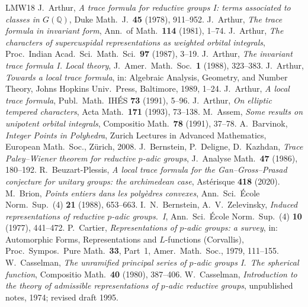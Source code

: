\documentclass[12pt,letterpaper]{article}
\numberwithin{equation}{section}
\theoremstyle{plain}
\theoremstyle{remark}
\theoremstyle{plain}
\theoremstyle{definition}
\theoremstyle{remark}
\theoremstyle{remark}
\begin{document}
\begin{thebibliography}{LMW18}
 J.~Arthur, \emph{A trace formula for reductive groups I: terms associated to classes in $G(\mathbb{Q})$}, Duke Math.\ J.\ \textbf{45} (1978), 911--952.
 J.~Arthur, \emph{The trace formula in invariant form}, Ann.\ of Math.\ \textbf{114} (1981), 1--74.
 J.~Arthur, \emph{The characters of supercuspidal representations as weighted orbital integrals}, Proc.\ Indian Acad.\ Sci.\ Math.\ Sci.\ \textbf{97} (1987), 3--19.
 J.~Arthur, \emph{The invariant trace formula I. Local theory}, J.\ Amer.\ Math.\ Soc.\ \textbf{1} (1988), 323--383.
 J.~Arthur, \emph{Towards a local trace formula}, in: Algebraic Analysis, Geometry, and Number Theory, Johns Hopkins Univ.\ Press, Baltimore, 1989, 1--24.
 J.~Arthur, \emph{A local trace formula}, Publ.\ Math.\ IH\'ES \textbf{73} (1991), 5--96.
 J.~Arthur, \emph{On elliptic tempered characters}, Acta Math.\ \textbf{171} (1993), 73--138.
 M.~Assem, \emph{Some results on unipotent orbital integrals}, Compositio Math.\ \textbf{78} (1991), 37--78.
 A.~Barvinok, \emph{Integer Points in Polyhedra}, Zurich Lectures in Advanced Mathematics, European Math.\ Soc., Z\"urich, 2008.
 J.~Bernstein, P.~Deligne, D.~Kazhdan, \emph{Trace Paley--Wiener theorem for reductive $p$-adic groups}, J.\ Analyse Math.\ \textbf{47} (1986), 180--192.
 R.~Beuzart-Plessis, \emph{A local trace formula for the Gan--Gross--Prasad conjecture for unitary groups: the archimedean case}, Ast\'erisque \textbf{418} (2020).
 M.~Brion, \emph{Points entiers dans les poly\`edres convexes}, Ann.\ Sci.\ \'Ecole Norm.\ Sup.\ (4) \textbf{21} (1988), 653--663.
 I.~N.~Bernstein, A.~V.~Zelevinsky, \emph{Induced representations of reductive $p$-adic groups.\ I}, Ann.\ Sci.\ \'Ecole Norm.\ Sup.\ (4) \textbf{10} (1977), 441--472.
 P.~Cartier, \emph{Representations of $p$-adic groups: a survey}, in: Automorphic Forms, Representations and $L$-functions (Corvallis), Proc.\ Sympos.\ Pure Math.\ \textbf{33}, Part~1, Amer.\ Math.\ Soc., 1979, 111--155.
 W.~Casselman, \emph{The unramified principal series of $p$-adic groups I.\ The spherical function}, Compositio Math.\ \textbf{40} (1980), 387--406.
 W.~Casselman, \emph{Introduction to the theory of admissible representations of $p$-adic reductive groups}, unpublished notes, 1974; revised draft 1995.

\end{thebibliography}
\end{document}
